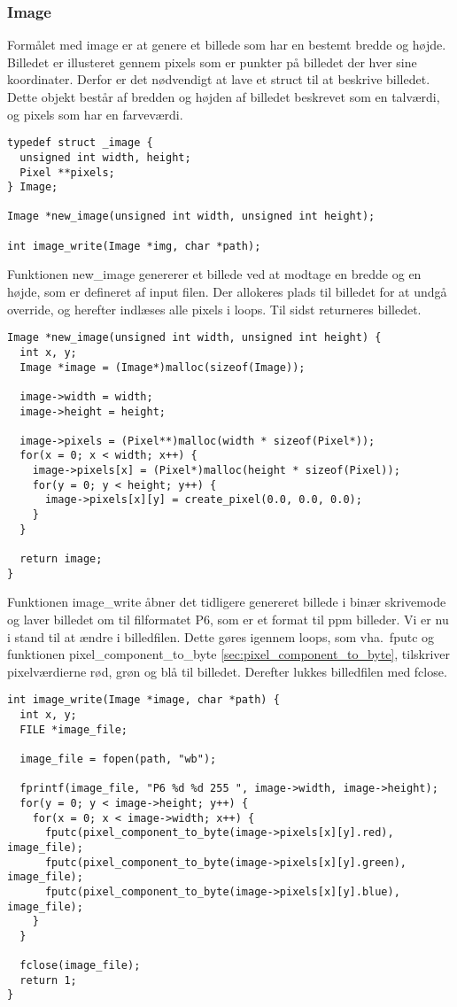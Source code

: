 \subsubsection{Image}
Formålet med image er at genere et billede som har en bestemt bredde og højde. Billedet er illusteret gennem pixels som er punkter på billedet der hver sine koordinater. Derfor er det nødvendigt at lave et struct til at beskrive billedet. Dette objekt består af bredden og højden af billedet beskrevet som en talværdi, og pixels som har en farveværdi.

\begin{lstlisting}[style=Cstyle, caption=light struct]
typedef struct _image {
  unsigned int width, height;
  Pixel **pixels;
} Image;

Image *new_image(unsigned int width, unsigned int height);

int image_write(Image *img, char *path);
\end{lstlisting}

Funktionen new\_image genererer et billede ved at modtage en bredde og en højde, som er defineret af input filen. Der allokeres plads til billedet for at undgå override, og herefter indlæses alle pixels i loops. Til sidst returneres billedet.

\begin{lstlisting}[style=Cstyle, caption=light struct]
Image *new_image(unsigned int width, unsigned int height) {
  int x, y;
  Image *image = (Image*)malloc(sizeof(Image));
  
  image->width = width;
  image->height = height;

  image->pixels = (Pixel**)malloc(width * sizeof(Pixel*));
  for(x = 0; x < width; x++) {
    image->pixels[x] = (Pixel*)malloc(height * sizeof(Pixel));
    for(y = 0; y < height; y++) {
      image->pixels[x][y] = create_pixel(0.0, 0.0, 0.0);
    }
  }

  return image;
}
\end{lstlisting}

Funktionen image\_write åbner det tidligere genereret billede i binær skrivemode og laver billedet om til filformatet P6, som er et format til ppm billeder. Vi er nu i stand til at ændre i billedfilen. Dette gøres igennem loops, som vha.\ fputc og funktionen pixel\_component\_to\_byte \ref{sec:pixel_component_to_byte}, tilskriver pixelværdierne rød, grøn og blå til billedet. Derefter lukkes billedfilen med fclose.  

\begin{lstlisting}[style=Cstyle, caption=light struct]
int image_write(Image *image, char *path) {
  int x, y;
  FILE *image_file;

  image_file = fopen(path, "wb");
  
  fprintf(image_file, "P6 %d %d 255 ", image->width, image->height);
  for(y = 0; y < image->height; y++) {
    for(x = 0; x < image->width; x++) {
      fputc(pixel_component_to_byte(image->pixels[x][y].red), image_file);
      fputc(pixel_component_to_byte(image->pixels[x][y].green), image_file);
      fputc(pixel_component_to_byte(image->pixels[x][y].blue), image_file);
    }
  }

  fclose(image_file);
  return 1;
}
\end{lstlisting}


